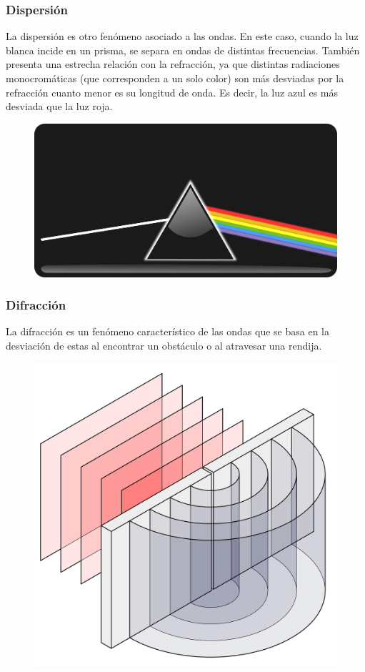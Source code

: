 \documentclass[10pt,a4paper]{article}
\begin{document}
\subsubsection{Dispersión}
La dispersión es otro fenómeno asociado a las ondas. En este caso, cuando la luz blanca incide en un prisma, se separa en ondas de distintas frecuencias.  También presenta una estrecha relación con la refracción, ya que distintas radiaciones monocromáticas (que corresponden a un solo color) son más desviadas por la refracción cuanto menor es su longitud de onda. Es decir, la luz azul es más desviada que la luz roja. 
\begin{figure}[H]
\centering
\includegraphics[scale=0.18]{Imagenes/Dispersion_01}
\end{figure}

\subsubsection{Difracción}
La difracción es un fenómeno característico de las ondas que se basa en la desviación de estas al encontrar un obstáculo o al atravesar una rendija.
\begin{figure}[H]
\centering
\includegraphics[scale=0.18]{Imagenes/Difraccion_01}
\end{figure}
\end{document}
